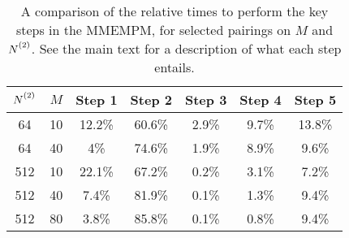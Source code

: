 \begin{table}
    \begin{center}
        \begin{tabular}{ c c c c c c c }
            \toprule
            $\Ntwo$ &
            $M$ &
            Step 1 &
            Step 2 &
            Step 3 &
            Step 4 &
            Step 5 \\
            \midrule
            64 & 10 & 12.2\% & 60.6\% & 2.9\% & 9.7\% & 13.8\% \\
            64 & 40 & 4\% & 74.6\% & 1.9\% & 8.9\% & 9.6\% \\
            512 & 10 & 22.1\% & 67.2\% & 0.2\% & 3.1\% & 7.2\% \\
            512 & 40 & 7.4\% & 81.9\% & 0.1\% & 1.3\% & 9.4\% \\
            512 & 80 & 3.8\% & 85.8\% & 0.1\% & 0.8\% & 9.4\% \\
            \bottomrule
        \end{tabular}
    \end{center}
    \caption[
        A comparison of the relative times to perform the key steps in the \acs{MMEMPM}.
    ]{
        A comparison of the relative times to perform the key steps in the
        \acs{MMEMPM}, for selected pairings on $M$ and $\Ntwo$. See the main
        text for a description of what each step entails.
    }
    \label{tab:mmempm-steps}
\end{table}

